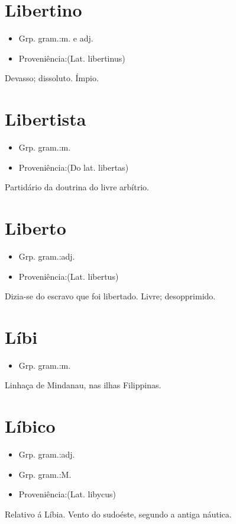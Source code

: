 \section{Libertino}
\begin{itemize}
\item {Grp. gram.:m.  e  adj.}
\end{itemize}
\begin{itemize}
\item {Proveniência:(Lat. \textunderscore libertinus\textunderscore )}
\end{itemize}
Devasso; dissoluto.
Ímpio.
\section{Libertista}
\begin{itemize}
\item {Grp. gram.:m.}
\end{itemize}
\begin{itemize}
\item {Proveniência:(Do lat. \textunderscore libertas\textunderscore )}
\end{itemize}
Partidário da doutrina do livre arbítrio.
\section{Liberto}
\begin{itemize}
\item {Grp. gram.:adj.}
\end{itemize}
\begin{itemize}
\item {Proveniência:(Lat. \textunderscore libertus\textunderscore )}
\end{itemize}
Dizia-se do escravo que foi libertado.
Livre; desopprimido.
\section{Líbi}
\begin{itemize}
\item {Grp. gram.:m.}
\end{itemize}
Linhaça de Mindanau, nas ilhas Filippinas.
\section{Líbico}
\begin{itemize}
\item {Grp. gram.:adj.}
\end{itemize}
\begin{itemize}
\item {Grp. gram.:M.}
\end{itemize}
\begin{itemize}
\item {Proveniência:(Lat. \textunderscore libycus\textunderscore )}
\end{itemize}
Relativo á Líbia.
Vento do sudoéste, segundo a antiga náutica.
